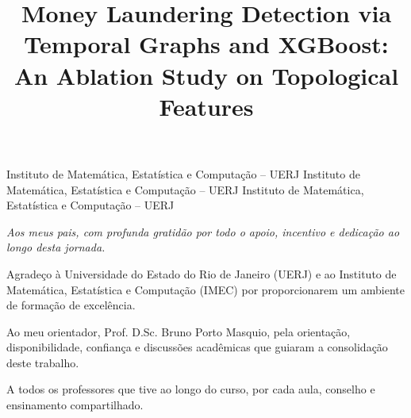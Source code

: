 \documentclass[a4paper,12pt,oneside,onecolumn,final,fleqn]{repUERJ}
\title{Money Laundering Detection via Temporal Graphs and XGBoost: An Ablation Study on Topological Features}
\begin{document}
\frontmatter %

\capa
\folhaderosto
%
%
%
%
\fichacatalografica{}
%
%
\begin{folhadeaprovacao}
             {Instituto de Matemática, Estatística e Computação -- UERJ}
             {Instituto de Matemática, Estatística e Computação -- UERJ}
             {Instituto de Matemática, Estatística e Computação -- UERJ}
\end{folhadeaprovacao}
%
%
\vfill
\begin{flushright}
  \begin{minipage}{8cm}
    \textit{Aos meus pais, com profunda gratidão por todo o apoio, incentivo e dedicação ao longo desta jornada.}
  \end{minipage}
\end{flushright}
%
%

Agradeço à Universidade do Estado do Rio de Janeiro (UERJ) e ao Instituto de Matemática, Estatística e Computação (IMEC) por proporcionarem um ambiente de formação de excelência.

Ao meu orientador, Prof. D.Sc. Bruno Porto Masquio, pela orientação, disponibilidade, confiança e discussões acadêmicas que guiaram a consolidação deste trabalho.

A todos os professores que tive ao longo do curso, por cada aula, conselho e ensinamento compartilhado.
\end{document}
